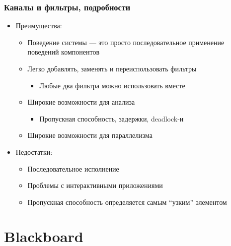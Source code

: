 \documentclass{../cscslides}
\begin{document}
    \begin{frame}
        \frametitle{Каналы и фильтры, подробности}
        \begin{itemize}
            \item Преимущества:
            \begin{itemize}
                \item Поведение системы --- это просто последовательное применение поведений компонентов
                \item Легко добавлять, заменять и переиспользовать фильтры
                \begin{itemize}
                    \item Любые два фильтра можно использовать вместе
                \end{itemize}
                \item Широкие возможности для анализа
                \begin{itemize}
                    \item Пропускная способность, задержки, deadlock-и
                \end{itemize}
                \item Широкие возможности для параллелизма
            \end{itemize}
            \item Недостатки:
            \begin{itemize}
                \item Последовательное исполнение
                \item Проблемы с интерактивными приложениями
                \item Пропускная способность определяется самым ``узким'' элементом
            \end{itemize}
        \end{itemize}
    \end{frame}

    \section{Blackboard}
\end{document}
